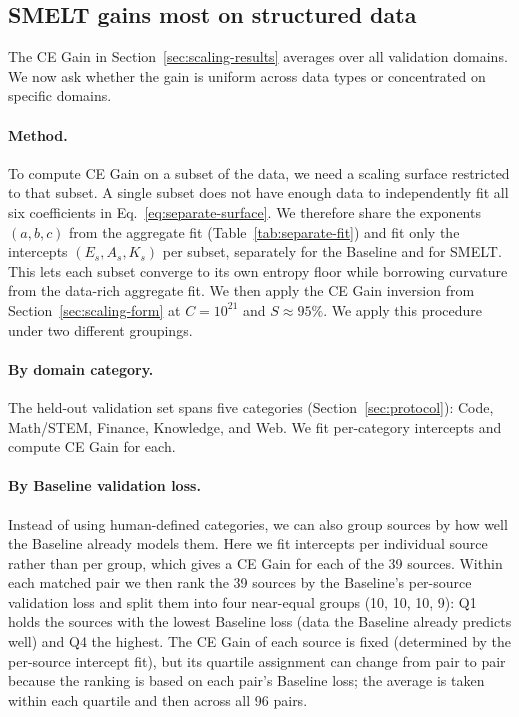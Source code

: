 \documentclass[]{bytedance_seed}
\newcommand{\archname}{SMELT}
\theoremstyle{definition}
\theoremstyle{remark}
\begin{document}
\FloatBarrier

\subsection{\archname{} gains most on structured data}
\label{sec:per-source}

%
The CE Gain in Section~\ref{sec:scaling-results} averages over all validation domains.
%
We now ask whether the gain is uniform across data types or concentrated on specific domains.

\paragraph{Method.}
%
To compute CE Gain on a subset of the data, we need a scaling surface restricted to that subset.
%
A single subset does not have enough data to independently fit all six coefficients in Eq.~\ref{eq:separate-surface}.
%
We therefore share the exponents $(a, b, c)$ from the aggregate fit (Table~\ref{tab:separate-fit}) and fit only the intercepts $(E_s, A_s, K_s)$ per subset, separately for the Baseline and for \archname{}.
%
This lets each subset converge to its own entropy floor while borrowing curvature from the data-rich aggregate fit.
%
We then apply the CE Gain inversion from Section~\ref{sec:scaling-form} at $C = 10^{21}$ and $S \approx 95\%$.
%
We apply this procedure under two different groupings.

\paragraph{By domain category.}
%
The held-out validation set spans five categories (Section~\ref{sec:protocol}): Code, Math/STEM, Finance, Knowledge, and Web.
%
We fit per-category intercepts and compute CE Gain for each.

\paragraph{By Baseline validation loss.}
%
Instead of using human-defined categories, we can also group sources by how well the Baseline already models them.
%
Here we fit intercepts per individual source rather than per group, which gives a CE Gain for each of the 39 sources.
%
Within each matched pair we then rank the 39 sources by the Baseline's per-source validation loss and split them into four near-equal groups (10, 10, 10, 9): Q1 holds the sources with the lowest Baseline loss (data the Baseline already predicts well) and Q4 the highest.
%
The CE Gain of each source is fixed (determined by the per-source intercept fit), but its quartile assignment can change from pair to pair because the ranking is based on each pair's Baseline loss; the average is taken within each quartile and then across all 96 pairs.
%
\end{document}
